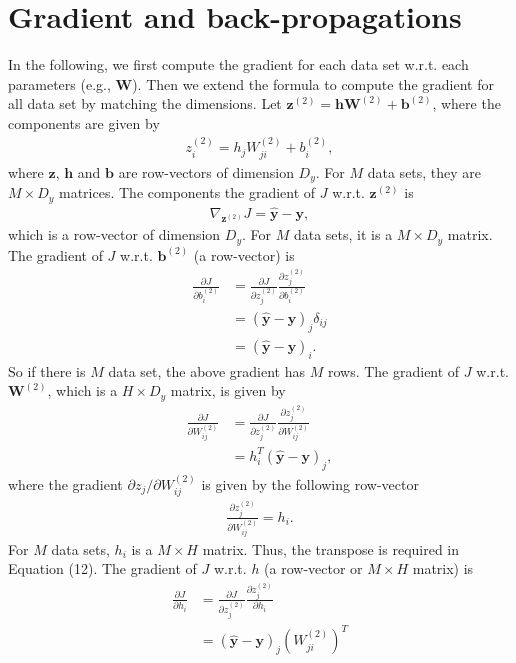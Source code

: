 \documentclass[10pt,letterpaper]{article}
\begin{document}
\section{Gradient and back-propagations}
In the following, we first compute the gradient for each data set w.r.t. each parameters (e.g., $\mathbf{W}$). Then we extend the formula to compute the gradient for all data set by matching the dimensions. Let $\mathbf{z}^{(2)} = \mathbf{h}\mathbf{W}^{(2)}+\mathbf{b}^{(2)}$, where the components are given by
\begin{align}
z^{(2)}_i = h_j W^{(2)}_{ji} + b^{(2)}_i,
\end{align}
where $\mathbf{z}$, $\mathbf{h}$ and $\mathbf{b}$ are row-vectors of dimension $D_y$. For $M$ data sets, they are $M\times D_y$ matrices. The components  the gradient of $J$ w.r.t. $\mathbf{z}^{(2)}$ is
\begin{align}
\nabla_{\mathbf{z}^{(2)}} J = \hat{\mathbf{y}} - \mathbf{y},
\end{align}
which is a row-vector of dimension $D_y$. For $M$ data sets, it is a $M\times D_y$ matrix. The gradient of $J$ w.r.t. $\mathbf{b}^{(2)}$ (a row-vector) is
\begin{align}
\frac{\partial J}{\partial b^{(2)}_i} &= \frac{\partial J}{\partial z^{(2)}_j}\frac{\partial z^{(2)}_j}{\partial b^{(2)}_i} \\
&= (\hat{\mathbf{y}} - \mathbf{y})_j \delta_{ij} \\
&= (\hat{\mathbf{y}} - \mathbf{y})_i.
\end{align}
So if there is $M$ data set, the above gradient has $M$ rows. The gradient of $J$ w.r.t. $\mathbf{W}^{(2)}$, which is a $H\times D_y$ matrix, is given by
\begin{align}
\frac{\partial J}{\partial W^{(2)}_{ij}} &= \frac{\partial J}{\partial z^{(2)}_j}\frac{\partial z^{(2)}_j}{\partial W^{(2)}_{ij}} \\
&= h^T_i (\hat{\mathbf{y}} - \mathbf{y})_j,
\end{align}
where the gradient $\partial z_j/\partial W^{(2)}_{ij}$ is given by the following row-vector
\begin{align}
\frac{\partial z^{(2)}_j}{\partial W^{(2)}_{ij}} = h_i.
\end{align}
For $M$ data sets, $h_i$ is a $M \times H$ matrix. Thus, the transpose is required in Equation (12). The gradient of $J$ w.r.t. $h$ (a row-vector or $M \times H$ matrix) is
\begin{align}
\frac{\partial J}{\partial h_i} &= \frac{\partial J}{\partial z^{(2)}_j}\frac{\partial z^{(2)}_j}{\partial h_i} \\
&= (\hat{\mathbf{y}} - \mathbf{y})_j (W^{(2)}_{ji})^T
\end{align}
\end{document}
